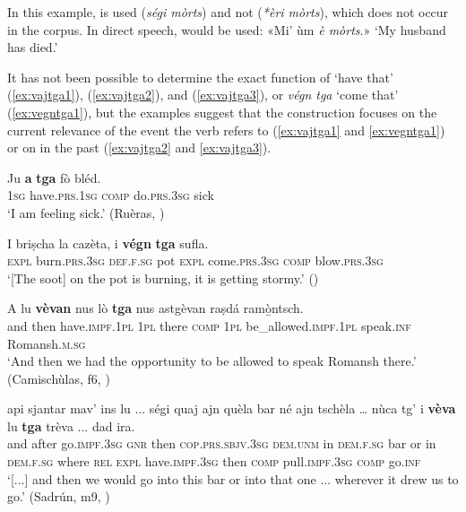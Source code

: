In this example,  is used (\textit{ségi mòrts}) and not  (\textit{*èri mòrts}), which does not occur in the corpus. In direct speech,  would be used: «Mi' ùm \textit{è mòrts}.» `My husband has died.'

\label{sec:4.1.2.2.12}
It has not been possible to determine the exact function of \textit{} `have that' (\ref{ex:vajtga1}), (\ref{ex:vajtga2}), and (\ref{ex:vajtga3}), or \textit{végn tga} `come that' (\ref{ex:vegntga1}), but the examples suggest that the construction focuses on the current relevance of the event the verb refers to (\ref{ex:vajtga1} and \ref{ex:vegntga1}) or on  in the past (\ref{ex:vajtga2} and \ref{ex:vajtga3}).

\ea
\label{ex:vajtga1}
\gll  Ju \textbf{a} \textbf{tga} fò bléd.\\
\textsc{1sg} have.\textsc{prs.1sg} \textsc{comp} do.\textsc{prs.3sg} sick\\
\glt `I am feeling sick.' (Ruèras, )
\z

\ea
\label{ex:vegntga1}
\gll I briṣcha la cazèta, i \textbf{végn} \textbf{tga} sufla. \\
\textsc{expl} burn.\textsc{prs.3sg} \textsc{def.f.sg} pot \textsc{expl} come.\textsc{prs.3sg} \textsc{comp} blow.\textsc{prs.3sg} \\
\glt `[The soot] on the pot is burning, it is getting stormy.' ()
\z

\ea
\label{ex:vajtga2}
\gll    A lu \textbf{vèvan} nus lò \textbf{tga} nus astgèvan raṣdá ramò̱ntsch.\\
and then have.\textsc{impf.1pl} \textsc{1pl} there \textsc{comp} \textsc{1pl} be\_allowed.\textsc{impf.1pl} speak.\textsc{inf} Romansh.\textsc{m.sg} \\
\glt `And then we had the opportunity to be allowed to speak Romansh there.' (Camischùlas, f6, )
\z

\ea
\label{ex:vajtga3}
\gll  [...] api sjantar mav’ ins lu ... ségi quaj ajn quèla bar né ajn tschèla … nùca tg’ i \textbf{vèva} lu \textbf{tga} trèva ... dad ira.  \\
{} and after go.\textsc{impf.3sg} \textsc{gnr} then {} \textsc{cop.prs.sbjv.3sg} \textsc{dem.unm} in \textsc{dem.f.sg} bar or in \textsc{dem.f.sg} {} where \textsc{rel} \textsc{expl} have.\textsc{impf.3sg} then \textsc{comp} pull.\textsc{impf.3sg} {} \textsc{comp} go.\textsc{inf}\\
\glt `[...] and then we would go into this bar or into that one ... wherever it drew us to go.' (Sadrún, m9, )
\z

